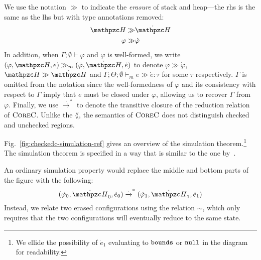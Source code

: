 We use the notation $\gg$ to
indicate the \emph{erasure} of stack and heap---the rhs is the same as
the lhs but with type annotations removed:
\begin{equation*}
  \begin{split}
    \heap  \gg & \dot \heap \\
    \varphi \gg & \dot \varphi
  \end{split}
\end{equation*}
In addition, when $\Gamma;\emptyset\vdash
\varphi$ and $\varphi$ is well-formed, we write $(\varphi,\heap,e) \gg_m (\dot \varphi, \dot \heap,
\dot e)$ to denote $\varphi \gg \dot \varphi$, $\heap \gg \dot \heap$
and $\Gamma;\Theta;\emptyset \vdash_m e \gg \dot e : \tau$ for some $\tau$ respectively. $\Gamma$ is omitted from the notation since the well-formedness of $\varphi$ and its consistency with respect to $\Gamma$ imply that $e$ must be closed under $\varphi$, allowing us to recover $\Gamma$ from $\varphi$.
Finally, we use $\xrightarrow{\cdot}^*$ to denote the transitive closure of the
reduction relation of $\textsc{CoreC}$. Unlike the $\lang$, the semantics of
$\textsc{CoreC}$ does not distinguish checked and unchecked regions.

Fig.~\ref{fig:checkedc-simulation-ref} gives an overview of 
the simulation theorem.\footnote{We ellide the  possibility of $\dot e_1$ evaluating to $\mathtt{bounds}$ or $\mathtt{null}$ in the diagram for readability.} The simulation theorem is specified in a way
that is similar to the one by~\citet{merigoux2021catala}.

An ordinary simulation property would
replace the middle and bottom parts of the figure with the
following: \[(\dot \varphi_0, \dot \heap_0, \dot e_0) 
  \xrightarrow{\cdot}^* (\dot \varphi_1, \dot \heap_1, \dot e_1)\]
Instead, we relate two erased configurations using the relation $\sim$,
which only requires that the two configurations will eventually reduce
to the same state.


